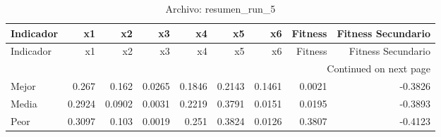 \begin{longtable}{lrrrrrrrr}
\caption{Archivo: resumen\_run\_5}\label{tab:resumen_run_5} \\
\toprule
Indicador & x1 & x2 & x3 & x4 & x5 & x6 & Fitness & Fitness Secundario \\
\midrule
\endfirsthead
\toprule
Indicador & x1 & x2 & x3 & x4 & x5 & x6 & Fitness & Fitness Secundario \\
\midrule
\endhead
\midrule
\multicolumn{9}{r}{Continued on next page} \\
\midrule
\endfoot
\bottomrule
\endlastfoot
Mejor & 0.267 & 0.162 & 0.0265 & 0.1846 & 0.2143 & 0.1461 & 0.0021 & -0.3826 \\
Media & 0.2924 & 0.0902 & 0.0031 & 0.2219 & 0.3791 & 0.0151 & 0.0195 & -0.3893 \\
Peor & 0.3097 & 0.103 & 0.0019 & 0.251 & 0.3824 & 0.0126 & 0.3807 & -0.4123 \\
\end{longtable}